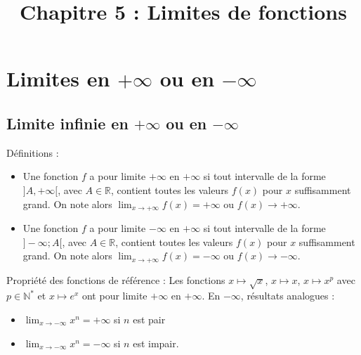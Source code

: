 \documentclass[11pt,a4paper]{article}
\begin{document}
\title{\textbf{Chapitre 5 : Limites de fonctions }}
\date{}
\maketitle

\section{Limites en $+\infty$ ou en $-\infty$}

\subsection{Limite infinie en $+\infty$ ou en $-\infty$}

\begin{boiteDef}{Définitions :}
\begin{itemize}
    \item Une fonction $f$ a pour limite $+\infty$ en $+\infty$ si tout intervalle de la forme $]A,+\infty[$, avec $A\in\mathbb{R}$, contient toutes les valeurs $f(x)$ pour $x$ suffisamment grand.
    \newline
    On note alors $\displaystyle \lim_{x \to +\infty} f(x) = +\infty$ ou $f(x) \to +\infty$.
    \item Une fonction $f$ a pour limite $-\infty$ en $+\infty$ si tout intervalle de la forme $]-\infty;A[$, avec $A\in\mathbb{R}$, contient toutes les valeurs $f(x)$ pour $x$ suffisamment grand.
    \newline
    On note alors $\displaystyle \lim_{x \to +\infty} f(x) = -\infty$ ou $f(x) \to -\infty$.
\end{itemize}
\end{boiteDef}

\begin{boiteProp}{Propriété des fonctions de référence :}
    Les fonctions $x\mapsto \sqrt{x}$, $x\mapsto x$, $x\mapsto x^p$ avec $p\in\mathbb{N}^*$ et $x\mapsto e^x$ ont pour limite $+\infty$ en $+\infty$.
    \newline
    En $-\infty$, résultats analogues :
    \begin{itemize}
        \item $\displaystyle \lim_{x\to -\infty} x^n = +\infty$ si $n$ est pair 
        \item $\displaystyle \lim_{x\to -\infty} x^n =-\infty$ si $n$ est impair.
    \end{itemize}
\end{boiteProp}
\end{document}
